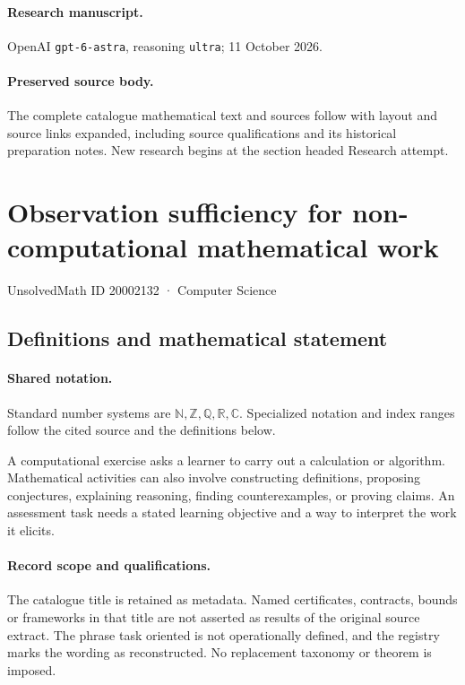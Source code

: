 \documentclass[11pt]{article}
\begin{document}
\paragraph{Research manuscript.} OpenAI \texttt{gpt-6-astra}, reasoning \texttt{ultra}; 11 October 2026.
\paragraph{Preserved source body.} The complete catalogue mathematical text and sources follow with layout and source links expanded, including source qualifications and its historical preparation notes. New research begins at the section headed Research attempt.

\section{Observation sufficiency for non-computational mathematical work}\label{20002132}
{\small UnsolvedMath ID 20002132 · Computer Science}
\subsection{Definitions and mathematical statement}

\paragraph{Shared notation.}Standard number systems are $\mathbb N,\mathbb Z,\mathbb Q,\mathbb R,\mathbb C$. Specialized notation and index ranges follow the cited source and the definitions below.


A computational exercise asks a learner to carry out a calculation or algorithm. Mathematical activities can also involve constructing definitions, proposing conjectures, explaining reasoning, finding counterexamples, or proving claims. An assessment task needs a stated learning objective and a way to interpret the work it elicits.
\paragraph{Record scope and qualifications.}
The catalogue title is retained as metadata. Named certificates, contracts, bounds or frameworks in that title are not asserted as results of the original source extract.
The phrase task oriented is not operationally defined, and the registry marks the wording as reconstructed. No replacement taxonomy or theorem is imposed.
\end{document}
